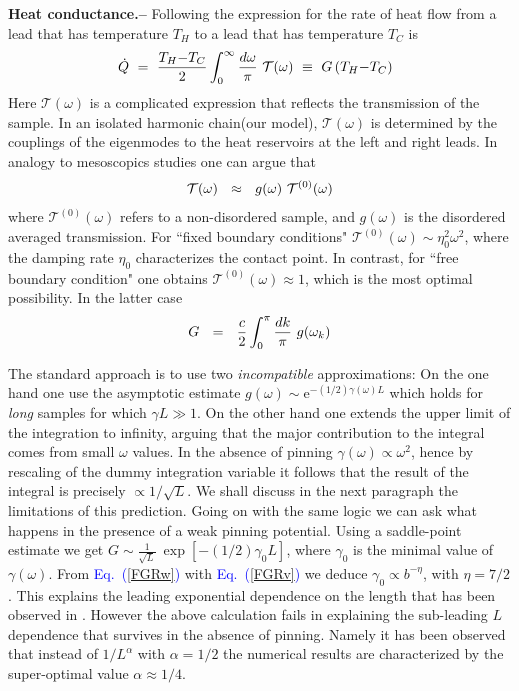\documentclass[onecolumn,fleqn,notitlepage,secnumarabic]{revtex4}
\newcommand{\Eq}[1]{\textcolor{blue}{Eq.\!\!~(\ref{#1})}}
\newcommand{\eexp}{\mbox{e}^}
\newcommand{\be}[1]{\begin{eqnarray}\ifthenelse{#1=-1}{\nonumber}{\ifthenelse{#1=0}{}{\label{e#1}}}}
\newcommand{\ee}{\end{eqnarray}}
\newcommand{\beq}{\be{1}}
\newcommand{\eeq}{\ee}
\newcommand{\sect}[1]{{\bf #1.-- }}
\begin{document}
\sect{Heat conductance}
%
Following  \cite{D08,D01,DL08} the expression for the rate of heat flow from 
a lead that has temperature $T_H$ to a lead that has temperature $T_C$ is 
% 
\beq
\dot{Q} \ = \ 
\frac{T_H{-}T_C}{2} \int_{0}^{\infty} \frac{d\omega}{\pi} \ \mathcal{T}(\omega) 
\ \equiv \ G \, (T_H{-}T_C) \ \ 
\label{qg}
\eeq
%
Here $\mathcal{T}(\omega)$ is a complicated expression that reflects 
the transmission of the sample.  
In an isolated harmonic chain(our model), 
${\mathcal{T}(\omega)}$ is determined by 
the couplings of the eigenmodes to the heat reservoirs
at the left and right leads. 
In analogy to mesoscopics studies \cite{D08,D01} one can argue that
%
\beq
\mathcal{T}(\omega) \ \ \approx \ \ g(\omega) \ \mathcal{T}^{(0)}(\omega)
\eeq
%
where $\mathcal{T}^{(0)}(\omega)$ refers to a non-disordered sample, 
and $g(\omega)$ is the disordered averaged transmission. 
For ``fixed boundary conditions" ${\mathcal{T}^{(0)}(\omega)\sim \eta_0^2\omega^2}$,
where the damping rate $\eta_0$ characterizes the contact point.
In contrast, for ``free boundary condition" one obtains ${\mathcal{T}^{(0)}(\omega)\approx 1}$, 
which is the most optimal possibility. In the latter case  
%
\be{17}
G \ \ = \ \ \frac{c}{2} \int_0^{\pi} \frac{d k}{\pi} \ g(\omega_k) 
\eeq

The standard approach is to use two {\em incompatible} approximations:
On the one hand one use the asymptotic estimate ${g(\omega) \sim \eexp{-(1/2)\gamma(\omega) L}}$ 
which holds for {\em long} samples for which $\gamma L\gg 1$. 
On the other hand one extends the upper limit of the integration to infinity, 
arguing that the major contribution to the integral comes from small $\omega$ values.
% 
In the absence of pinning $\gamma(\omega)\propto\omega^2$, hence by rescaling 
of the dummy integration variable it follows that the result of the integral 
is precisely $\propto 1/\sqrt{L}$. 
%
We shall discuss in the next paragraph the limitations of this prediction. 
Going on with the same logic we can ask what happens in the presence of 
a weak pinning potential. Using a saddle-point estimate 
we get $G \sim  \frac{1}{\sqrt{L}} \ \exp\left[ -(1/2) \gamma_0 L \right]$, 
where $\gamma_0$ is the minimal value of $\gamma(\omega)$. 
From \Eq{FGRw} with \Eq{FGRv} we deduce $\gamma_{0} \propto b^{-\eta}$, with $\eta=7/2$.
This explains the leading exponential dependence on the length 
that has been observed in \cite{BZFK13}. 
However the above calculation fails in explaining the 
sub-leading $L$ dependence that survives in the absence of pinning.
Namely it has been observed that instead of $1/L^{\alpha}$ with $\alpha=1/2$
the numerical results are characterized by the super-optimal value ${\alpha \approx 1/4}$.  
\end{document}
